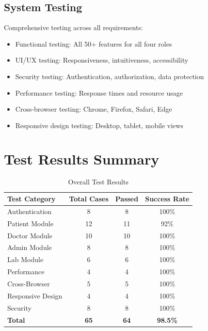 \subsection{System Testing}
Comprehensive testing across all requirements:
\begin{itemize}
    \item Functional testing: All 50+ features for all four roles
    \item UI/UX testing: Responsiveness, intuitiveness, accessibility
    \item Security testing: Authentication, authorization, data protection
    \item Performance testing: Response times and resource usage
    \item Cross-browser testing: Chrome, Firefox, Safari, Edge
    \item Responsive design testing: Desktop, tablet, mobile views
\end{itemize}

\section{Test Results Summary}

\begin{table}[H]
    \centering
    \small
    \begin{tabular}{|p{2.5cm}|c|c|c|}
        \hline
        \textbf{Test Category} & \textbf{Total Cases} & \textbf{Passed} & \textbf{Success Rate} \\
        \hline
        Authentication & 8 & 8 & 100\% \\
        \hline
        Patient Module & 12 & 11 & 92\% \\
        \hline
        Doctor Module & 10 & 10 & 100\% \\
        \hline
        Admin Module & 8 & 8 & 100\% \\
        \hline
        Lab Module & 6 & 6 & 100\% \\
        \hline
        Performance & 4 & 4 & 100\% \\
        \hline
        Cross-Browser & 5 & 5 & 100\% \\
        \hline
        Responsive Design & 4 & 4 & 100\% \\
        \hline
        Security & 8 & 8 & 100\% \\
        \hline
        \textbf{Total} & \textbf{65} & \textbf{64} & \textbf{98.5\%} \\
        \hline
    \end{tabular}
    \caption{Overall Test Results}
    \label{tab:test-summary}
\end{table}

